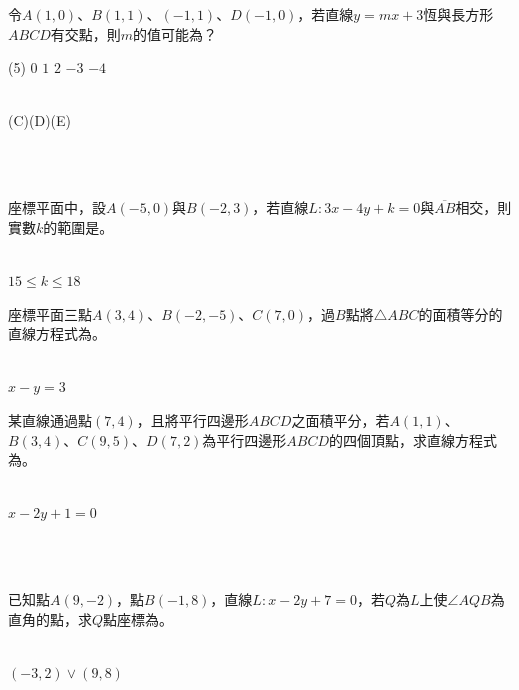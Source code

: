 \documentclass
[answers]
{exam}
\newcommand\ul[1]{\uline{\hspace*{#1}}}
\theoremstyle{definition}
\begin{document}
\begin{questions}
\question

令$A\left( 1,0\right)$、$B\left( 1,1\right)$、$\left( -1,1\right)$、$D\left( -1,0\right)$，若直線$y=mx+3$恆與長方形$ABCD$有交點，則$m$的值可能為？

\begin{tasks}(5)
	\task $0$
	\task $1$
	\task $2$
	\task $-3$
	\task $-4$
\end{tasks}

\begin{solution}~\\
	(C)(D)(E)
\end{solution}

$ $\\$ $\\

\question

座標平面中，設$A\left( -5,0\right)$與$B\left( -2,3\right)$，若直線$L:3x-4y+k=0$與$\overline{AB}$相交，則實數$k$的範圍是\ul{50pt}。
\\ 
\begin{solution}~\\
	$15 \leq k \leq 18$
\end{solution}

\question

座標平面三點$A\left( 3,4\right)$、$B\left( -2,-5\right)$、$C\left( 7,0\right)$，過$B$點將$\triangle ABC$的面積等分的直線方程式為\ul{50pt}。
\\ 
\begin{solution}~\\
	$x-y=3$
\end{solution}

\question

某直線通過點$\left( 7,4\right)$，且將平行四邊形$ABCD$之面積平分，若$A\left( 1,1\right)$、$B\left( 3,4\right)$、$C\left( 9,5\right)$、$D\left( 7,2\right)$為平行四邊形$ABCD$的四個頂點，求直線方程式為\ul{50pt}。
\\ 
\begin{solution}~\\
	$x-2y+1=0$
\end{solution}

$ $\\$ $\\
\question

已知點$A\left( 9,-2\right)$，點$B\left( -1,8\right)$，直線$L:x-2y+7=0$，若$Q$為$L$上使$\angle AQB$為直角的點，求$Q$點座標為\ul{50pt}。
\\ 
\begin{solution}~\\
	$\left( -3,2 \right) \vee \left( 9,8 \right)$
\end{solution}


\end{questions}
\end{document}
